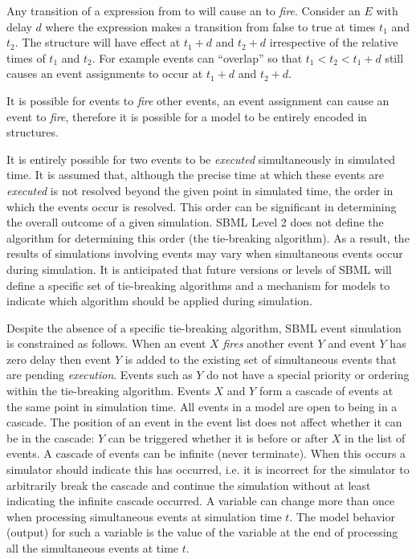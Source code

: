 Any transition of a  expression from  to
 will cause an  to \emph{fire}.  Consider
an  $E$ with delay $d$ where the 
expression makes a transition from false to true at times $t_1$
and $t_2$.  The \EventAssignment structure will have effect at
$t_1+d$ and $t_2+d$ irrespective of the relative times of $t_1$
and $t_2$. For example events can ``overlap'' so that $t_1 < t_2 <
t_1+d$ still causes an event assignments to occur at $t_1+d$ and
$t_2+d$.

It is possible for events to \emph{fire} other events, \ie an
event assignment can cause an event to \emph{fire}, therefore it
is possible for a model to be entirely encoded in \Event
structures.

It is entirely possible for two events to be \emph{executed}
simultaneously in simulated time.  It is assumed that, although
the precise time at which these events are \emph{executed} is not
resolved beyond the given point in simulated time, the order in
which the events occur is resolved.  This order can be significant
in determining the overall outcome of a given simulation. SBML
Level 2 does not define the algorithm for determining this order
(the tie-breaking algorithm).  As a result, the results of
simulations involving events may vary when simultaneous events
occur during simulation.  It is anticipated that future versions
or levels of SBML will define a specific set of tie-breaking
algorithms and a mechanism for models to indicate which algorithm
should be applied during simulation.

Despite the absence of a specific tie-breaking algorithm, SBML
event simulation is constrained as follows. When an event $X$
\emph{fires} another event $Y$ and event $Y$ has zero delay then
event $Y$ is added to the existing set of simultaneous events that
are pending \emph{execution}.  Events such as $Y$ do not have a
special priority or ordering within the tie-breaking algorithm.
Events $X$ and $Y$ form a cascade of events at the same point in
simulation time.  All events in a model are open to being in a
cascade.  The position of an event in the event list does not
affect whether it can be in the cascade: $Y$ can be triggered
whether it is before or after $X$ in the list of events.  A
cascade of events can be infinite (never terminate).  When this
occurs a simulator should indicate this has occurred, i.e. it is
incorrect for the simulator to arbitrarily break the cascade and
continue the simulation without at least indicating the infinite
cascade occurred. A variable can change more than once when
processing simultaneous events at simulation time $t$.  The model
behavior (output) for such a variable is the value of the variable
at the end of processing all the simultaneous events at time $t$.


